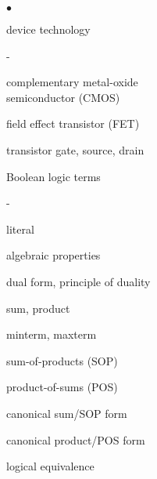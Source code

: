 \begin{minipage}[t]{3in}
\begin{list}{$\bullet$}{\setlength{\itemsep}{0pt}\setlength{\parskip}{0pt}%
\setlength{\topsep}{0pt}\setlength{\partopsep}{0pt}\setlength{\parsep}{0pt}}

\item{device technology}
\begin{list}{-}{\setlength{\itemsep}{0pt}\setlength{\parskip}{0pt}%
\setlength{\topsep}{0pt}\setlength{\partopsep}{0pt}\setlength{\parsep}{0pt}}
\item{complementary metal-oxide\\ semiconductor (CMOS)}
\item{field effect transistor (FET)}
\item{transistor gate, source, drain}
\end{list}

\item{Boolean logic terms}
\begin{list}{-}{\setlength{\itemsep}{0pt}\setlength{\parskip}{0pt}%
\setlength{\topsep}{0pt}\setlength{\partopsep}{0pt}\setlength{\parsep}{0pt}}
\item{literal}
\item{algebraic properties}
\item{dual form, principle of duality}
\item{sum, product}
\item{minterm, maxterm}
\item{sum-of-products (SOP)}
\item{product-of-sums (POS)}
\item{canonical sum/SOP form}
\item{canonical product/POS form}
\item{logical equivalence}
\end{list}


\end{list}
\end{minipage}
